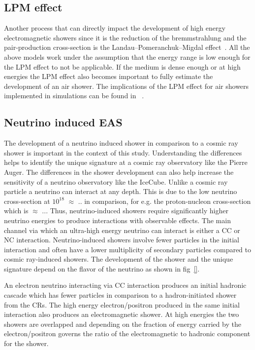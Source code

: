 \subsection*{LPM effect}
Another process that can directly impact the development of high energy electromagnetic showers since it is the reduction of the bremmstrahlung and the pair-production cross-section is the Landau–Pomeranchuk–Migdal effect~\cite{}. All the above models work under the assumption that the energy range is low enough for the LPM effect to not be applicable. If the medium is dense enough or at high energies the LPM effect also becomes important to fully estimate the development of an air shower. The implications of the LPM effect for air showers implemented in simulations can be found in ~\cite{}. 

\subsection*{Neutrino induced EAS}
\label{sec:Dev_Nu}
The development of a neutrino induced shower in comparison to a cosmic ray shower is important in the context of this study. Understanding the differences helps to identify the unique signature at a cosmic ray observatory like the Pierre Auger. The differences in the shower development can also help increase the sensitivity of a neutrino observatory like the IceCube.  Unlike a cosmic ray particle a neutrino can interact at any depth. This is due to the low neutrino cross-section at $10^{18}$ $\approx$ .. in comparison, for e.g. the proton-nucleon cross-section which is $\approx$ ... Thus, neutrino-induced showers require significantly higher neutrino energies to produce interactions with observable effects. The main channel via which an ultra-high energy neutrino can interact is either a CC or NC interaction. Neutrino-induced showers involve fewer particles in the initial interaction and often have a lower multiplicity of secondary particles compared to cosmic ray-induced showers. The development of the shower and the unique signature depend on the flavor of the neutrino as shown in fig~\ref{}.

An electron neutrino interacting via CC interaction produces an initial hadronic cascade which has fewer particles in comparison to a hadron-initiated shower from the CRs. The high energy electron/positron produced in the same initial interaction also produces an electromagnetic shower. At high energies the two showers are overlapped and depending on the fraction of energy carried by the electron/positron governs the ratio of the electromagnetic to hadronic component for the shower.

